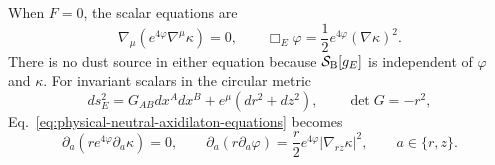 When $F=0$, the scalar equations are
\begin{equation}
 \nabla_\mu\!\left(e^{4\varphi}\nabla^\mu\kappa\right)=0,
 \qquad
 \Box_E\varphi=\frac12e^{4\varphi}(\nabla\kappa)^2.
 \label{eq:physical-neutral-axidilaton-equations}
\end{equation}
There is no dust source in either equation because
$\mathcal S_{\rm B}[g_E]$ is independent of $\varphi$ and $\kappa$.
For invariant scalars in the circular metric
\begin{equation}
 ds_E^2=G_{AB}dx^A dx^B
 +e^\mu(dr^2+dz^2),
 \qquad
 \det G=-r^2,
 \label{eq:physical-EMDA-circular-metric}
\end{equation}
Eq.~\eqref{eq:physical-neutral-axidilaton-equations} becomes
\begin{equation}
 \partial_a\!\left(re^{4\varphi}\partial_a\kappa\right)=0,
 \qquad
 \partial_a(r\partial_a\varphi)
 =\frac r2e^{4\varphi}|\nabla_{rz}\kappa|^2,
 \qquad a\in\{r,z\}.
 \label{eq:physical-neutral-orbit-equations}
\end{equation}

